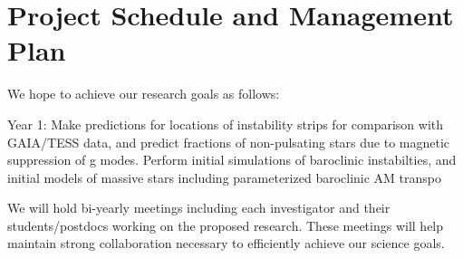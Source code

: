 \section{Project Schedule and Management Plan}

We hope to achieve our research goals as follows:

Year 1: Make predictions for locations of instability strips for comparison with GAIA/TESS data, and predict fractions of non-pulsating stars due to magnetic suppression of g modes. Perform initial simulations of baroclinic instabilties, and initial models of massive stars including parameterized baroclinic AM transpo 

We will  hold bi-yearly meetings including each investigator and their students/postdocs working on the proposed research. These meetings will help maintain strong collaboration necessary to efficiently achieve our science goals.
